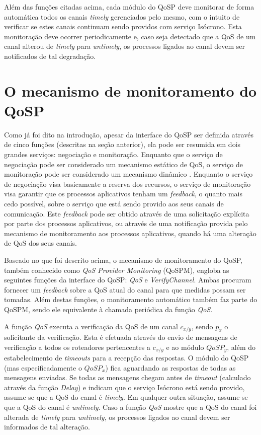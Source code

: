 	Além das funções citadas acima, cada módulo do QoSP deve monitorar de forma automática todos os canais \textit{timely} gerenciados pelo mesmo, com o intuito de verificar se estes canais continuam sendo providos com serviço Isócrono. Esta monitoração deve ocorrer periodicamente e, caso seja detectado que a QoS de um canal alterou de \textit{timely} para \textit{untimely}, os processos ligados ao canal devem ser notificados de tal degradação.
		
\section{O mecanismo de monitoramento do QoSP}

	Como já foi dito na introdução, apesar da interface do QoSP ser definida através de cinco funções (descritas na seção anterior), ela pode ser resumida em dois grandes serviços: negociação e monitoração. Enquanto que o serviço de negociação pode ser considerado um mecanismo estático de QoS, o serviço de monitoração pode ser considerado um mecanismo dinâmico \cite{ACH96}. Enquanto o serviço de negociação visa basicamente a reserva dos recursos, o serviço de monitoração visa garantir que os processos aplicativos tenham um \textit{feedback}, o quanto mais cedo possível, sobre o serviço que está sendo provido aos seus canais de comunicação. Este \textit{feedback} pode ser obtido através de uma solicitação explícita por parte dos processos aplicativos, ou através de uma notificação provida pelo mecanismo de monitoramento aos processos aplicativos, quando há uma alteração de QoS dos seus canais.
	
	Baseado no que foi descrito acima, o mecanismo de monitoramento do QoSP, também conhecido como \textit{QoS Provider Monitoring} (QoSPM), engloba as seguintes funções da interface do QoSP: \textit{QoS} e \textit{VerifyChannel}. Ambas procuram fornecer um \textit{feedback} sobre a QoS atual do canal para que medidas possam ser tomadas. Além destas funções, o monitoramento automático também faz parte do QoSPM, sendo ele equivalente à chamada periódica da função \textit{QoS}.
	
	A função \textit{QoS} executa a verificação da QoS de um canal $c_{x/y}$, sendo $p_{x}$ o solicitante da verificação. Esta é efetuada através do envio de mensagens de verificação a todos os roteadores pertencentes a $c_{x/y}$ e ao módulo $QoSP_{y}$, além do estabelecimento de \textit{timeouts} para a recepção das respostas. O módulo do QoSP (mas especificadamente o $QoSP_{x}$) fica aguardando as respostas de todas as mensagens enviadas. Se todas as mensagens chegam antes de \textit{timeout} (calculado através da função \textit{Delay}) e indicam que o serviço Isócrono está sendo provido, assume-se que a QoS do canal é \textit{timely}. Em qualquer outra situação, assume-se que a QoS do canal é \textit{untimely}. Caso a função \textit{QoS} mostre que a QoS do canal foi alterada de \textit{timely} para \textit{untimely}, os processos ligados ao canal devem ser informados de tal alteração.
	
